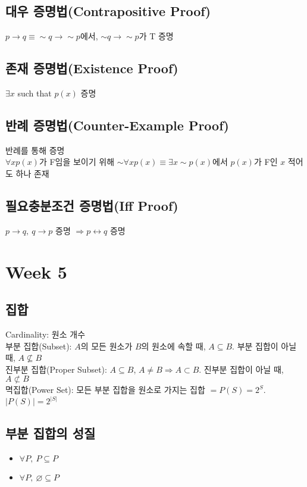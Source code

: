 \subsection{대우 증명법(Contrapositive Proof)}
$p \to q \equiv \sim q \to \sim p$에서, $\sim q \to \sim p$가 T 증명

\subsection{존재 증명법(Existence Proof)}
$\exists x$ such that $p(x)$ 증명

\subsection{반례 증명법(Counter-Example Proof)}
반례를 통해 증명\\
$\forall x p(x)$가 F임을 보이기 위해 $\sim \forall x p(x) \equiv \exists x \sim p(x)$에서  $p(x)$가 F인 $x$ 적어도 하나 존재

\subsection{필요충분조건 증명법(Iff Proof)}
$p \to q,\ q\to p$ 증명 $\Rightarrow p \leftrightarrow q$ 증명

\newpage
\section{Week 5}
\subsection{집합}
Cardinality: 원소 개수\\
부분 집합(Subset): $A$의 모든 원소가 $B$의 원소에 속할 때, $A\subseteq B$. 부분 집합이 아닐 때, $A \nsubseteq B$\\
진부분 집합(Proper Subset): $A \subseteq B$, $A \neq B \Longrightarrow A\subset B$. 진부분 집합이 아닐 때, $A \not\subset B$\\
멱집합(Power Set): 모든 부분 집합을 원소로 가지는 집합 $= P(S) = 2^S$. $|P(S)|=2^{|S|}$
\subsection{부분 집합의 성질}
\begin{itemize}
    \item $\forall P,\ P \subseteq P$
    \item $\forall P,\ \varnothing \subseteq P$
\end{itemize}
